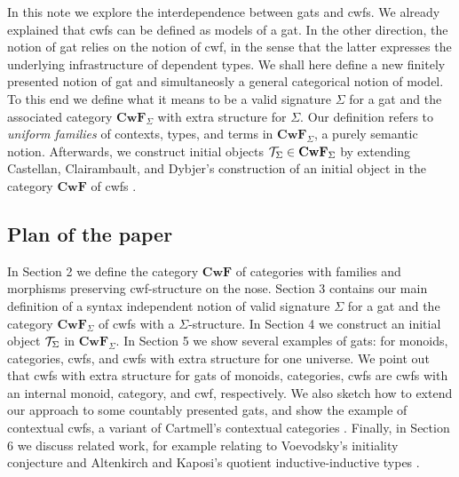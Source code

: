 \documentclass{lmcs}
\def\Cwf{\mathbf{CwF}}
\begin{document}
In this note we explore the interdependence between gats and cwfs. We already explained that cwfs can be defined as models of a gat. 
In the other direction, the notion of gat relies on the notion of cwf, in the sense that the latter expresses the underlying infrastructure of dependent types. We shall here define a new finitely presented notion of gat and simultaneosly a general categorical notion of model. To this end we define what it means to be a valid signature $\Sigma$ for a gat and the associated category $\Cwf_\Sigma$ with extra structure for $\Sigma$. Our definition refers to {\em uniform families} of contexts, types, and terms in $\Cwf_\Sigma$, a purely semantic notion. Afterwards, we construct initial objects $\T_\Sigma \in \Cwf_\Sigma$ by extending Castellan, Clairambault, and Dybjer's  construction of an initial object in the category $\Cwf$ of cwfs \cite{castellan:tlca2015,castellan:lmcs}.


\subsection*{Plan of the paper}

In Section 2 we define the category $\Cwf$ of categories with families and morphisms preserving cwf-structure on the nose. Section 3 contains our main definition of a syntax independent notion of valid signature $\Sigma$ for a gat and the category $\Cwf_\Sigma$ of cwfs with a $\Sigma$-structure. In Section 4 we construct an initial object ${\mathcal T}_\Sigma$ in $\Cwf_\Sigma$. In Section 5 we show several examples of gats: for monoids, categories, cwfs, and cwfs with extra structure for one universe. We point out that cwfs with extra structure for gats of monoids, categories, cwfs are cwfs with an internal monoid, category, and cwf, respectively. We also sketch how to extend our approach to some countably presented gats, and show the example of contextual cwfs, a variant of Cartmell's contextual categories \cite{cartmell:phd,cartmell:apal}. Finally, in Section 6 we discuss related work, for example relating to Voevodsky's initiality conjecture \cite{voevodsky:initiality} and Altenkirch and Kaposi's quotient inductive-inductive types \cite{altenkirch:qiits}.
\end{document}
